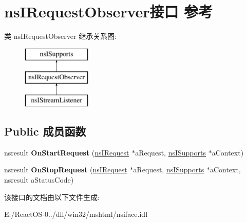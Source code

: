 \hypertarget{interfacens_i_request_observer}{}\section{ns\+I\+Request\+Observer接口 参考}
\label{interfacens_i_request_observer}
类 ns\+I\+Request\+Observer 继承关系图\+:\begin{figure}[H]
\begin{center}
\leavevmode
\includegraphics[height=3.000000cm]{interfacens_i_request_observer}
\end{center}
\end{figure}
\subsection*{Public 成员函数}
\begin{DoxyCompactItemize}
\item 
\mbox{\label{interfacens_i_request_observer_a197d2543d56b81a4e1aac9e3610c8418}} 
nsresult {\bfseries On\+Start\+Request} (\hyperlink{interfacens_i_request}{ns\+I\+Request} $\ast$a\+Request, \hyperlink{interfacens_i_supports}{ns\+I\+Supports} $\ast$a\+Context)
\item 
\mbox{\label{interfacens_i_request_observer_a2e7588ec5f1cdfd632db1461b2b8f7de}} 
nsresult {\bfseries On\+Stop\+Request} (\hyperlink{interfacens_i_request}{ns\+I\+Request} $\ast$a\+Request, \hyperlink{interfacens_i_supports}{ns\+I\+Supports} $\ast$a\+Context, nsresult a\+Status\+Code)
\end{DoxyCompactItemize}


该接口的文档由以下文件生成\+:\begin{DoxyCompactItemize}
\item 
E\+:/\+React\+O\+S-\/0../dll/win32/mshtml/nsiface.\+idl\end{DoxyCompactItemize}
